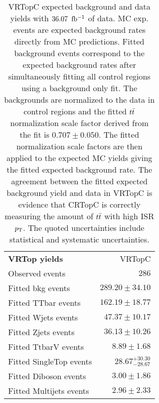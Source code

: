 

\begin{table} [h!]
\caption[VRTopC expected background and data yields with $\intlumi$ $\ifb$ of data]{VRTopC expected background and data yields with $\intlumi$ $\ifb$ of data. MC exp. events are expected background rates directly from MC predictions.  Fitted background events correspond to the expected background rates after simultaneously fitting all control regions using a background only fit.  The backgrounds are normalized to the data in control regions and the fitted $t\bar{t}$ normalization scale factor derived from the fit is $0.707\pm0.050$.  The fitted normalization scale factors are then applied to the expected MC yields giving the fitted expected background rate.  The agreement between the fitted expected background yield and data in VRTopC is evidence that CRTopC is correctly measuring the amount of $t\bar{t}$ with high ISR $p_{\mathrm{T}}$.  The quoted uncertainties include statistical and systematic uncertainties. }
\label{table.bkgonly.VRTopC}
\begin{center}
\setlength{\tabcolsep}{0.0pc}
{\small
\begin{tabular*}{\textwidth}{@{\extracolsep{\fill}}lr}
\noalign{\smallskip}\hline\noalign{\smallskip}
{\bf VRTop yields}           & VRTopC               \\[-0.05cm]
\noalign{\smallskip}\hline\noalign{\smallskip}
Observed events          & $286$                            \\
\noalign{\smallskip}\hline\noalign{\smallskip}
Fitted bkg events         & $289.20 \pm 34.10$                   \\
\noalign{\smallskip}\hline\noalign{\smallskip}
        Fitted TTbar events         & $162.19 \pm 18.77$                   \\
        Fitted Wjets events         & $47.37 \pm 10.17$                    \\
        Fitted Zjets events         & $36.13 \pm 10.26$                   \\
        Fitted TtbarV events         & $8.89 \pm 1.68$                   \\
        Fitted SingleTop events         & $28.67_{-28.67}^{+30.30}$                      \\
        Fitted Diboson events         & $3.00 \pm 1.86$                       \\
        Fitted Multijets events         & $2.96 \pm 2.33$                      \\

\end{tabular*}}
\end{center}
\end{table}
